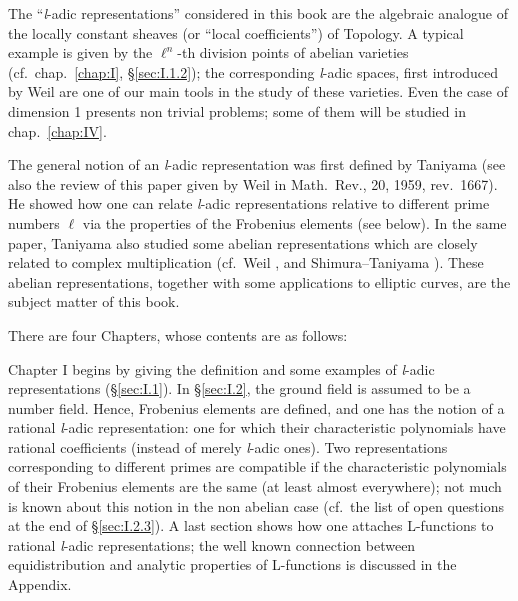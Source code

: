 
The ``\textit{l}-adic representations'' considered in this book are the
algebraic analogue of the locally constant sheaves (or ``local
coefficients'') of Topology. A typical example is given by the
$\ell^n$-th division points of abelian varieties (cf.~chap.~\ref{chap:I},
\S\ref{sec:I.1.2}); the corresponding \textit{l}-adic spaces, first
introduced by Weil \cite{weil-abelian} are one of our main tools in the
study of these varieties. Even the case of dimension 1 presents non trivial
problems; some of them will be studied in chap.~\ref{chap:IV}.

The general notion of an \textit{l}-adic representation was first defined
by Taniyama \cite{taniyama} (see also the review of this paper given by
Weil in Math.~Rev., 20, 1959, rev.~1667). He showed how one can relate
\textit{l}-adic representations relative to different prime numbers
$\ell$ via the properties of the Frobenius elements (see below). In the
same paper, Taniyama also studied some abelian representations which are
closely related to complex multiplication (cf.~Weil \cite{weil-characters},
\cite{weil-cm} and Shimura--Taniyama \cite{shimura-taniyama}). These
abelian representations, together with some applications to elliptic
curves, are the subject matter of this book.

There are four Chapters, whose contents are as follows:

Chapter I begins by giving the definition and some examples of
\textit{l}-adic representations (\S\ref{sec:I.1}). In \S\ref{sec:I.2}, the
ground field is assumed to be a number field. Hence, Frobenius elements
are defined, and one has the notion of a rational \textit{l}-adic
representation: one for which their characteristic polynomials have
rational coefficients (instead of merely \textit{l}-adic ones). Two
representations corresponding to different primes are compatible if the
characteristic polynomials of their Frobenius elements are the same (at
least almost everywhere); not much is known about this notion in the non
abelian case (cf.~the list of open questions at the end of
\S\ref{sec:I.2.3}). A last section shows how one attaches L-functions to
rational \textit{l}-adic representations; the well known connection
between equidistribution and analytic properties of L-functions is
discussed in the Appendix.


